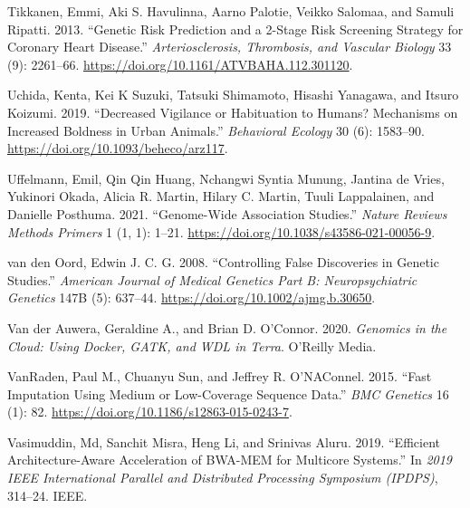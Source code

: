 \documentclass[
]{book}
\newlength{\cslhangindent}
\newlength{\cslentryspacingunit} %
\newenvironment{CSLReferences}[2] %
 {%
  \setlength{\parindent}{0pt}
  \ifodd #1
  \let\oldpar\par
  \def\par{\hangindent=\cslhangindent\oldpar}
  \fi
  \setlength{\parskip}{#2\cslentryspacingunit}
 }%
 {}
\begin{document}
\begin{CSLReferences}{1}{0}
\leavevmode{}%
Tikkanen, Emmi, Aki S. Havulinna, Aarno Palotie, Veikko Salomaa, and Samuli Ripatti. 2013. {``Genetic {Risk Prediction} and a 2-{Stage Risk Screening Strategy} for {Coronary Heart Disease}.''} \emph{Arteriosclerosis, Thrombosis, and Vascular Biology} 33 (9): 2261--66. \url{https://doi.org/10.1161/ATVBAHA.112.301120}.

\leavevmode{}%
Uchida, Kenta, Kei K Suzuki, Tatsuki Shimamoto, Hisashi Yanagawa, and Itsuro Koizumi. 2019. {``Decreased Vigilance or Habituation to Humans? {Mechanisms} on Increased Boldness in Urban Animals.''} \emph{Behavioral Ecology} 30 (6): 1583--90. \url{https://doi.org/10.1093/beheco/arz117}.

\leavevmode{}%
Uffelmann, Emil, Qin Qin Huang, Nchangwi Syntia Munung, Jantina de Vries, Yukinori Okada, Alicia R. Martin, Hilary C. Martin, Tuuli Lappalainen, and Danielle Posthuma. 2021. {``Genome-Wide Association Studies.''} \emph{Nature Reviews Methods Primers} 1 (1, 1): 1--21. \url{https://doi.org/10.1038/s43586-021-00056-9}.

\leavevmode{}%
van den Oord, Edwin J. C. G. 2008. {``Controlling False Discoveries in Genetic Studies.''} \emph{American Journal of Medical Genetics Part B: Neuropsychiatric Genetics} 147B (5): 637--44. \url{https://doi.org/10.1002/ajmg.b.30650}.

\leavevmode{}%
Van der Auwera, Geraldine A., and Brian D. O'Connor. 2020. \emph{Genomics in the Cloud: Using {Docker}, {GATK}, and {WDL} in {Terra}}. {O'Reilly Media}.

\leavevmode{}%
VanRaden, Paul M., Chuanyu Sun, and Jeffrey R. O'NAConnel. 2015. {``Fast Imputation Using Medium or Low-Coverage Sequence Data.''} \emph{BMC Genetics} 16 (1): 82. \url{https://doi.org/10.1186/s12863-015-0243-7}.

\leavevmode{}%
Vasimuddin, Md, Sanchit Misra, Heng Li, and Srinivas Aluru. 2019. {``Efficient Architecture-Aware Acceleration of {BWA-MEM} for Multicore Systems.''} In \emph{2019 {IEEE International Parallel} and {Distributed Processing Symposium} ({IPDPS})}, 314--24. {IEEE}.


\end{CSLReferences}
\end{document}
